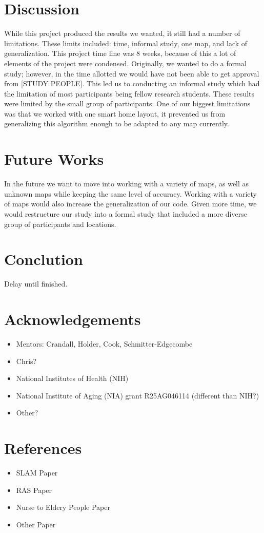 \documentclass[11pt, draft, a4paper]{IEEEtran}
\begin{document}
\section{Discussion}
While this project produced the results we wanted, it still had a number of 
limitations. These limits included: time, informal study, one map, and lack of 
generalization. This project time line was 8 weeks, because of this a lot of 
elements of the project were condensed. Originally, we wanted to do a formal 
study; however, in the time allotted we would have not been able to get 
approval from [STUDY PEOPLE]. This led us to conducting an informal study 
which had the limitation of most participants being fellow research students. 
These results were limited by the small group of participants. One of our 
biggest limitations was that we worked with one smart home layout, it 
prevented us from generalizing this algorithm enough to be adapted to any map 
currently. 


\section{Future Works}
In the future we want to move into working with a variety of maps, as well as 
unknown maps while keeping the same level of accuracy. Working with a variety 
of maps would also increase the generalization of our code. Given more time, 
we would restructure our study into a formal study that included a more 
diverse group of participants and locations. 


\section{Conclution}
Delay until finished.


\section{Acknowledgements}
\begin{itemize}
    \item Mentors: Crandall, Holder, Cook, Schmitter-Edgecombe
    \item Chris?
    \item National Institutes of Health (NIH)
    \item National Institute of Aging (NIA) grant R25AG046114  (different than NIH?)
    \item Other?
\end{itemize}


\section{References}
\begin{itemize}
    \item SLAM Paper
    \item RAS Paper
    \item Nurse to Eldery People Paper
    \item Other Paper
\end{itemize}



\end{document}
